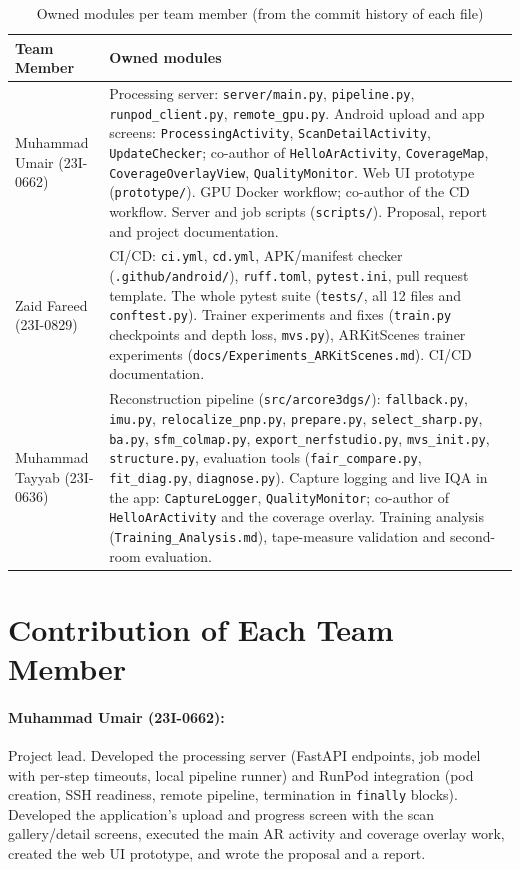 \begin{table}[htbp]
\centering
\small
\caption{Owned modules per team member (from the commit history of each file)}
\label{tab:responsibilities}
\begin{tabular}{p{3.2cm}p{9.3cm}}
\toprule
\textbf{Team Member} & \textbf{Owned modules} \\
\midrule
Muhammad Umair (23I-0662) & Processing server: \texttt{server/main.py}, \texttt{pipeline.py}, \texttt{runpod\_client.py}, \texttt{remote\_gpu.py}. Android upload and app screens: \texttt{ProcessingActivity}, \texttt{ScanDetailActivity}, \texttt{UpdateChecker}; co-author of \texttt{HelloArActivity}, \texttt{CoverageMap}, \texttt{CoverageOverlayView}, \texttt{QualityMonitor}. Web UI prototype (\texttt{prototype/}). GPU Docker workflow; co-author of the CD workflow. Server and job scripts (\texttt{scripts/}). Proposal, report and project documentation. \\
\midrule
Zaid Fareed (23I-0829) & CI/CD: \texttt{ci.yml}, \texttt{cd.yml}, APK/manifest checker (\texttt{.github/android/}), \texttt{ruff.toml}, \texttt{pytest.ini}, pull request template. The whole pytest suite (\texttt{tests/}, all 12 files and \texttt{conftest.py}). Trainer experiments and fixes (\texttt{train.py} checkpoints and depth loss, \texttt{mvs.py}), ARKitScenes trainer experiments (\texttt{docs/Experiments\_ARKitScenes.md}). CI/CD documentation. \\
\midrule
Muhammad Tayyab (23I-0636) & Reconstruction pipeline (\texttt{src/arcore3dgs/}): \texttt{fallback.py}, \texttt{imu.py}, \texttt{relocalize\_pnp.py}, \texttt{prepare.py}, \texttt{select\_sharp.py}, \texttt{ba.py}, \texttt{sfm\_colmap.py}, \texttt{export\_nerfstudio.py}, \texttt{mvs\_init.py}, \texttt{structure.py}, evaluation tools (\texttt{fair\_compare.py}, \texttt{fit\_diag.py}, \texttt{diagnose.py}). Capture logging and live IQA in the app: \texttt{CaptureLogger}, \texttt{QualityMonitor}; co-author of \texttt{HelloArActivity} and the coverage overlay. Training analysis (\texttt{Training\_Analysis.md}), tape-measure validation and second-room evaluation. \\
\bottomrule
\end{tabular}
\end{table}

\section{Contribution of Each Team Member}

\paragraph{Muhammad Umair (23I-0662):}
Project lead. Developed the processing server (FastAPI endpoints, job model with per-step timeouts, local pipeline runner) and RunPod integration (pod creation, SSH readiness, remote pipeline, termination in \texttt{finally} blocks). Developed the application's upload and progress screen with the scan gallery/detail screens, executed the main AR activity and coverage overlay work, created the web UI prototype, and wrote the proposal and a report.


